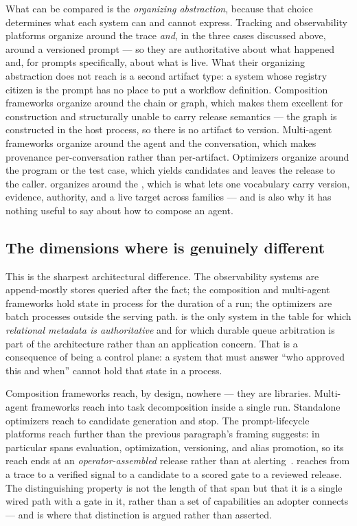What can be compared is the \emph{organizing abstraction}, because that choice
determines what each system can and cannot express. Tracking and observability
platforms organize around the trace \emph{and}, in the three cases discussed
above, around a versioned prompt --- so they are authoritative about what happened
and, for prompts specifically, about what is live. What their organizing
abstraction does not reach is a second artifact type: a system whose registry
citizen is the prompt has no place to put a workflow definition. Composition
frameworks organize around the chain or graph, which makes them excellent for
construction and structurally unable to carry release semantics --- the graph is
constructed in the host process, so there is no artifact to version. Multi-agent
frameworks organize around the agent and the conversation, which makes provenance
per-conversation rather than per-artifact. Optimizers organize around the program
or the test case, which yields candidates and leaves the release to the caller.
\sys organizes around the \gasset, which is what lets one vocabulary carry
version, evidence, authority, and a live target across families --- and is also
why it has nothing useful to say about how to compose an agent.

\subsection{The dimensions where \sys is genuinely different}

 This is the sharpest architectural difference.
The observability systems are append-mostly stores queried after the fact; the
composition and multi-agent frameworks hold state in process for the duration of a
run; the optimizers are batch processes outside the serving path. \sys is the only
system in the table for which \emph{relational metadata is authoritative} and for
which durable queue arbitration is part of the architecture rather than an
application concern. That is a consequence of being a control plane: a system that
must answer ``who approved this and when'' cannot hold that state in a process.

 Composition frameworks reach, by design, nowhere --- they
are libraries. Multi-agent frameworks reach into task decomposition inside a single
run. Standalone optimizers reach to candidate generation and stop. The
prompt-lifecycle platforms reach further than the previous paragraph's framing
suggests: \mlflow{} in particular spans evaluation, optimization, versioning, and
alias promotion, so its reach ends at an \emph{operator-assembled} release rather
than at alerting~\cite{mlflowpromptregistry,mlflowoptimize}. \sys reaches from a
trace to a verified signal to a candidate to a scored gate to a reviewed release.
The distinguishing property is not the length of that span but that it is a single
wired path with a gate in it, rather than a set of capabilities an adopter connects
--- and  is where that distinction is argued rather
than asserted.

